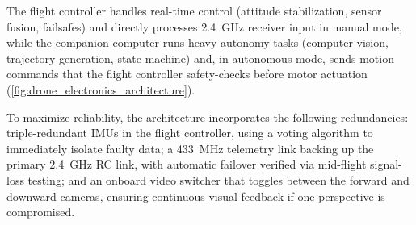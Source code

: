 %
%

The flight controller handles real-time control (attitude stabilization,
sensor fusion, failsafes) and directly processes \qty{2.4}{\giga\hertz}
receiver input in manual mode, while the companion computer runs heavy
autonomy tasks (computer vision, trajectory generation, state machine) and,
in autonomous mode, sends motion commands that the flight controller
safety-checks before motor actuation
(\autoref{fig:drone_electronics_architecture}).

To maximize reliability, the architecture incorporates the following
redundancies: triple-redundant IMUs in the flight controller, using a
voting algorithm to immediately isolate faulty data; a
\qty{433}{\mega\hertz} telemetry link backing up the primary
\qty{2.4}{\giga\hertz} RC link, with automatic failover verified via
mid-flight signal-loss testing; and an onboard video switcher that toggles
between the forward and downward cameras, ensuring continuous visual
feedback if one perspective is compromised.

